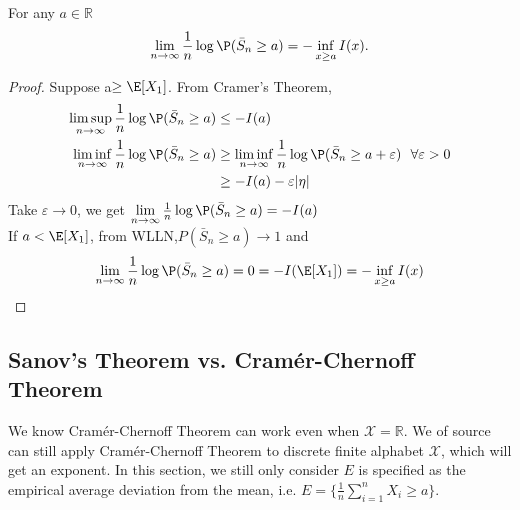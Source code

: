 \documentclass{article}
\begin{document}
\begin{cora}
For any $a\in\mathbb{R}$
\begin{align*}
\lim_{n\rightarrow\infty}\frac{1}{n}\log\P(\bar{S}_n\geq a)=-\inf\limits_{x\geq a}I(x).
\end{align*}
\end{cora}
\begin{proof}
	Suppose a$\geq \E[X_1]$. From Cramer's Theorem,
	\begin{align*}
		\limsup_{n\rightarrow\infty}\frac{1}{n}\log\P(\bar{S}_n\geq a)&\leq-I(a)\\
		\liminf_{n\rightarrow\infty}\frac{1}{n}\log\P(\bar{S}_n\geq a)
		&\geq\liminf\limits_{n\rightarrow\infty}\frac{1}{n}\log\P(\bar{S}_n\geq a+\varepsilon)\ \ \forall \varepsilon>0\\
		&\geq-I(a)-\varepsilon|\eta|	
	\end{align*}
	Take $\varepsilon\rightarrow0$, we get $\lim\limits_{n\rightarrow\infty}\frac{1}{n}\log\P(\bar{S}_n\geq a)=-I(a)$\\
	If $a<\E[X_1]$, from WLLN,$P(\bar{S}_n\geq a)\rightarrow1$ and
	\begin{align*}
		\lim\limits_{n\rightarrow\infty}\frac{1}{n}\log\P(\bar{S}_n\geq a)=0=-I(\E[X_1])=-\inf\limits_{x\geq a}I(x)
	\end{align*}

\end{proof}


\subsection{Sanov's Theorem vs. Cram\'{e}r-Chernoff Theorem}\label{ssect:ld_equ}

We know Cram\'{e}r-Chernoff Theorem can work even when $\mathcal{X}=\mathbb{R}$. We of source can still apply Cram\'{e}r-Chernoff Theorem to  discrete finite alphabet $\mathcal{X}$, which will get an exponent. In this section, we still only consider $E$ is specified as the empirical average deviation from the mean, i.e. $E=\{\frac{1}{n}\sum_{i=1}^n X_i\ge a\}$.
\end{document}

